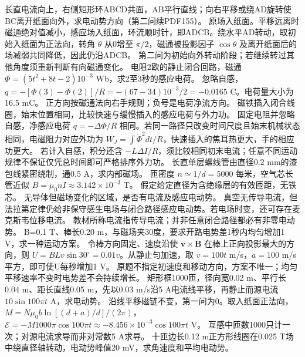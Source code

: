 \problemtext 长直电流向上，右侧矩形环ABCD共面，AB平行直线；向右平移或绕AD旋转使BC离开纸面向外，求电动势方向（第二问续PDF155）。
\workings 原场入纸面。平移远离时磁通绝对值减小，感应场入纸面，环流顺时针，即ADCB。绕水平AD转动，取初始入纸面为正法向，转角 $\theta$ 从0增至 $\pi/2$，磁通被投影因子 $\cos\theta$ 及离开纸面后的场减弱共同降低，因此仍沿ADCB。
\crosscheck 第二问为初始向外转动阶段；若继续转过其他角度须重新判断有向磁通变化。
\problemtext 电阻2欧的静止闭合回路，磁通 $\Phi=(5t^2+8t-2)10^{-3}$ Wb，求2至3秒的感应电荷。
\workings 忽略自感，$q=-[\Phi(3)-\Phi(2)]/R=-(67-34)10^{-3}/2=-0.0165$ C。电荷量大小为16.5 mC。
\crosscheck 正方向按磁通法向右手规则；负号是电荷净流方向。
\problemtext 磁铁插入闭合线圈，始末位置相同，比较快速与缓慢插入的感应电荷与外力功。
\workings 固定电阻并忽略自感，净感应电荷 $q=-\Delta\Phi/R$ 相同。若同一路径只改变时间尺度且始末机械状态相同，电磁阻力对应外功为 $W_J=\int \dot\Phi^2dt/R$，快速插入的焦耳热更大，手的相应功更大。
\crosscheck 若计入自感，积分还含 $-L\Delta I/R$，须比较相同初末电流；任意不同运动规律不保证仅凭总时间即可严格排序外力功。
\problemtext 长直单层螺线管由直径0.2 mm的漆包线紧密绕制，通0.5 A，求内部磁场。
\workings 匝密度 $n\simeq1/d=5000$ 每米，空气芯长管近似 $B=\mu_0nI\approx3.142\times10^{-3}$ T。
\crosscheck 假定给定直径为含绝缘层的有效匝距，无铁芯。
\problemtext 无导体但磁场变化的区域，是否有电流及感应电动势。
\workings 真空无传导电流，但法拉第定律仍给非保守感生电场与闭合路径感应电动势。若电场时变，还可存在麦克斯韦位移电流。
\crosscheck 教材所称电流指传导电流；并非任意闭合路径都必有非零电动势。
\problemtext B=0.1 T、棒长0.20 m，与磁场夹30度，要求开路电势差1秒内均匀增加1 V，求一种运动方案。
\workings 令棒方向固定、速度沿使 $\bm v\times\bm B$ 在棒上正向投影最大的方向，则 $U=BLv\sin30^\circ=0.01v$。从静止匀加速，取 $v=100t$ m/s，$a=100$ m/s平方，即可使U每秒增加1 V。
\crosscheck 原题不指定初速度和移动方向，方案不唯一；均匀平移速率不变时电势差不会持续增长。
\problemtext 矩形框1000匝，径向宽0.02 m、平行长0.04 m、距长直线0.05 m，先以0.03 m/s沿5 A电流线平移，再静止而源电流 $10\sin100\pi t$ A，求电动势。
\workings 沿线平移磁链不变，第一问为0。取入纸面正法向，$M=N\mu_0b\ln[(d+a)/d]/(2\pi)$，$\mathcal E=-M1000\pi\cos100\pi t\approx-8.456\times10^{-3}\cos100\pi t$ V。
\crosscheck 互感中匝数1000只计一次；对源电流求导而非对常数5 A求导。
\problemtext 十匝边长0.12 m正方形线圈在0.025 T场中绕直径轴转动，电动势峰值20 mV，求角速度和平均电动势。
